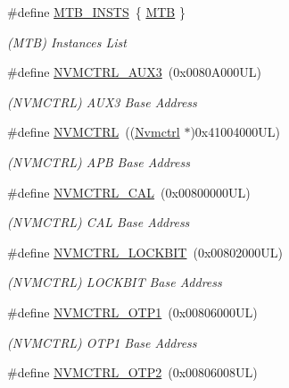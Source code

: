 \begin{DoxyCompactItemize}
\#define \mbox{\hyperlink{group___s_a_m_d21_g15_l__base_gafe3245cddfc6d3cb5c9a3f9fa99230fe}{M\+T\+B\+\_\+\+I\+N\+S\+TS}}~\{ \mbox{\hyperlink{group___s_a_m_d21_j18_a__base_ga09636f7f0071f50666d5747d44c6b94e}{M\+TB}} \}
\begin{DoxyCompactList}\small\item\em (M\+TB) Instances List \end{DoxyCompactList}\item 
\#define \mbox{\hyperlink{group___s_a_m_d21_g15_l__base_ga478afec83ff525e3abb7dfb5ca699f18}{N\+V\+M\+C\+T\+R\+L\+\_\+\+A\+U\+X3}}~(0x0080\+A000\+U\+L)
\begin{DoxyCompactList}\small\item\em (N\+V\+M\+C\+T\+RL) A\+U\+X3 Base Address \end{DoxyCompactList}\item 
\#define \mbox{\hyperlink{group___s_a_m_d21_g15_l__base_gad18608913d3d6e423f3a79d84348910a}{N\+V\+M\+C\+T\+RL}}~((\mbox{\hyperlink{struct_nvmctrl}{Nvmctrl}}  $\ast$)0x41004000\+U\+L)
\begin{DoxyCompactList}\small\item\em (N\+V\+M\+C\+T\+RL) A\+PB Base Address \end{DoxyCompactList}\item 
\#define \mbox{\hyperlink{group___s_a_m_d21_g15_l__base_ga0c60c42c3cf35f9e8af5c3228d9e7147}{N\+V\+M\+C\+T\+R\+L\+\_\+\+C\+AL}}~(0x00800000\+U\+L)
\begin{DoxyCompactList}\small\item\em (N\+V\+M\+C\+T\+RL) C\+AL Base Address \end{DoxyCompactList}\item 
\#define \mbox{\hyperlink{group___s_a_m_d21_g15_l__base_gad9901bcc2e9b40d87308e0d1e9557d1a}{N\+V\+M\+C\+T\+R\+L\+\_\+\+L\+O\+C\+K\+B\+IT}}~(0x00802000\+U\+L)
\begin{DoxyCompactList}\small\item\em (N\+V\+M\+C\+T\+RL) L\+O\+C\+K\+B\+IT Base Address \end{DoxyCompactList}\item 
\#define \mbox{\hyperlink{group___s_a_m_d21_g15_l__base_ga6ebf76a96eae94342ff79fce4311baf3}{N\+V\+M\+C\+T\+R\+L\+\_\+\+O\+T\+P1}}~(0x00806000\+U\+L)
\begin{DoxyCompactList}\small\item\em (N\+V\+M\+C\+T\+RL) O\+T\+P1 Base Address \end{DoxyCompactList}\item 
\#define \mbox{\hyperlink{group___s_a_m_d21_g15_l__base_gae182b953c491f84c19d160a97c7d2584}{N\+V\+M\+C\+T\+R\+L\+\_\+\+O\+T\+P2}}~(0x00806008\+U\+L)

\end{DoxyCompactItemize}
